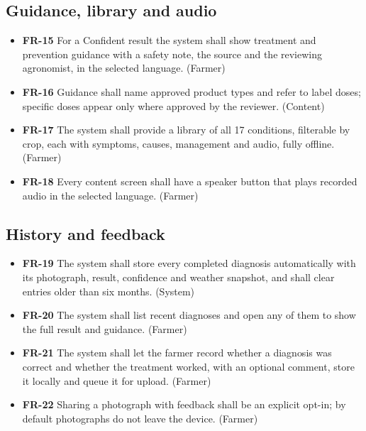 \subsection{Guidance, library and audio}
\begin{itemize}
  \item \textbf{FR-15} For a Confident result the system shall show treatment and prevention guidance with a safety note, the source and the reviewing agronomist, in the selected language. (Farmer)
  \item \textbf{FR-16} Guidance shall name approved product types and refer to label doses; specific doses appear only where approved by the reviewer. (Content)
  \item \textbf{FR-17} The system shall provide a library of all 17 conditions, filterable by crop, each with symptoms, causes, management and audio, fully offline. (Farmer)
  \item \textbf{FR-18} Every content screen shall have a speaker button that plays recorded audio in the selected language. (Farmer)
\end{itemize}
\subsection{History and feedback}
\begin{itemize}
  \item \textbf{FR-19} The system shall store every completed diagnosis automatically with its photograph, result, confidence and weather snapshot, and shall clear entries older than six months. (System)
  \item \textbf{FR-20} The system shall list recent diagnoses and open any of them to show the full result and guidance. (Farmer)
  \item \textbf{FR-21} The system shall let the farmer record whether a diagnosis was correct and whether the treatment worked, with an optional comment, store it locally and queue it for upload. (Farmer)
  \item \textbf{FR-22} Sharing a photograph with feedback shall be an explicit opt-in; by default photographs do not leave the device. (Farmer)
\end{itemize}
